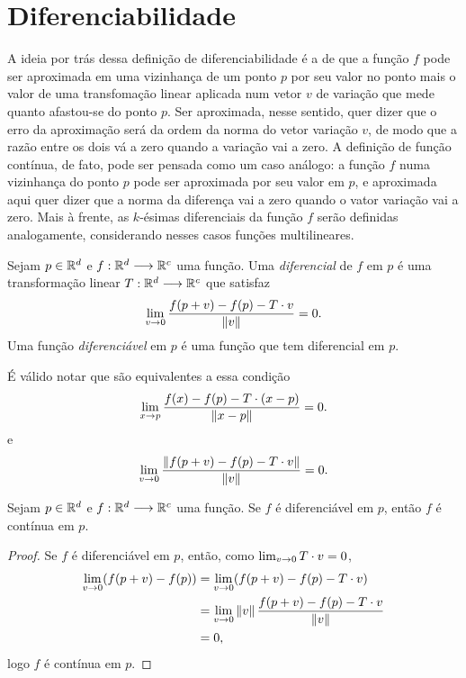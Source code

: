 \section{Diferenciabilidade}

A ideia por trás dessa definição de diferenciabilidade é a de que a função $f$ pode ser aproximada em uma vizinhança de um ponto $p$ por seu valor no ponto mais o valor de uma transfomação linear aplicada num vetor $v$ de variação que mede quanto afastou-se do ponto $p$. Ser aproximada, nesse sentido, quer dizer que o erro da aproximação será da ordem da norma do vetor variação $v$, de modo que a razão entre os dois vá a zero quando a variação vai a zero. A definição de função contínua, de fato, pode ser pensada como um caso análogo: a função $f$ numa vizinhança do ponto $p$ pode ser aproximada por seu valor em $p$, e aproximada aqui quer dizer que a norma da diferença vai a zero quando o vator variação vai a zero. Mais à frente, as $k$-ésimas diferenciais da função $f$ serão definidas analogamente, considerando nesses casos funções multilineares.

\begin{defi}
Sejam $p \in \mathbb{R}^d$ e $f: \mathbb{R}^d \longrightarrow \mathbb{R}^c$ uma função. Uma \emph{diferencial} de $f$ em $p$ é uma transformação linear $T : \mathbb{R}^d \longrightarrow \mathbb{R}^c$ que satisfaz
	\begin{equation*}
	\lim_{v \rightarrow 0} \frac{f(p+v)-f(p)-T \cdot v}{\left\Vert{v}\right\Vert} = 0.
	\end{equation*}
Uma função \emph{diferenciável} em $p$ é uma função que tem diferencial em $p$.
\end{defi}

É válido notar que são equivalentes a essa condição
	\begin{equation*}
	\lim_{x \rightarrow p} \frac{f(x)-f(p)-T\cdot(x-p)}{\left\Vert{x-p}\right\Vert} = 0.
	\end{equation*}
e
	\begin{equation*}
	\lim_{v \rightarrow 0} \frac{\left\Vert{f(p+v)-f(p)-T \cdot v}\right\Vert}{\left\Vert{v}\right\Vert} = 0.
	\end{equation*}

\begin{prop}
Sejam $p \in \mathbb{R}^d$ e $f: \mathbb{R}^d \longrightarrow \mathbb{R}^c$ uma função. Se $f$ é diferenciável em $p$, então $f$ é contínua em $p$.
\end{prop}
\begin{proof}
Se $f$ é diferenciável em $p$, então, como $\lim_{v \rightarrow 0} T \cdot v = 0$,
	\begin{align*}
	\lim_{v \rightarrow 0} (f(p+v)-f(p)) &= \lim_{v \rightarrow 0}(f(p+v)-f(p)-T \cdot v) \\
		&= \lim_{v \rightarrow 0}\left\Vert{v}\right\Vert \frac{f(p+v)-f(p)-T \cdot v}{\left\Vert{v}\right\Vert} \\
		&= 0,
	\end{align*}
logo $f$ é contínua em $p$.
\end{proof}

